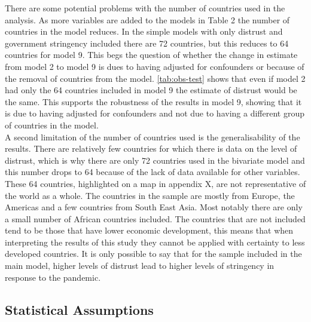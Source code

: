 \documentclass[
  11pt,
]{article}
\begin{document}
There are some potential problems with the number of countries used in the analysis. As more variables are added to the models in Table 2 the number of countries in the model reduces. In the simple models with only distrust and government stringency included there are 72 countries, but this reduces to 64 countries for model 9. This begs the question of whether the change in estimate from model 2 to model 9 is dues to having adjusted for confounders or because of the removal of countries from the model. \ref{tab:obs-test} shows that even if model 2 had only the 64 countries included in model 9 the estimate of distrust would be the same. This supports the robustness of the results in model 9, showing that it is due to having adjusted for confounders and not due to having a different group of countries in the model.\\
A second limitation of the number of countries used is the generalisability of the results. There are relatively few countries for which there is data on the level of distrust, which is why there are only 72 countries used in the bivariate model and this number drops to 64 because of the lack of data available for other variables. These 64 countries, highlighted on a map in appendix X, are not representative of the world as a whole. The countries in the sample are mostly from Europe, the Americas and a few countries from South East Asia. Most notably there are only a small number of African countries included. The countries that are not included tend to be those that have lower economic development, this means that when interpreting the results of this study they cannot be applied with certainty to less developed countries. It is only possible to say that for the sample included in the main model, higher levels of distrust lead to higher levels of stringency in response to the pandemic.\\

\hypertarget{statistical-assumptions}{%
\subsection{Statistical Assumptions}\label{statistical-assumptions}}
\end{document}

